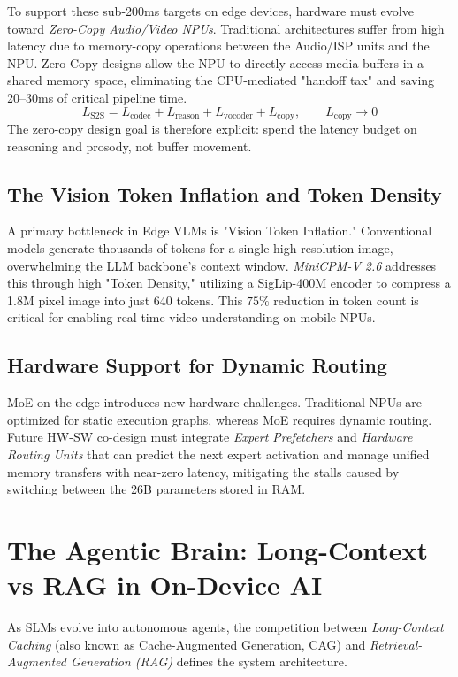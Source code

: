 \documentclass[twocolumn,10pt]{article}
\begin{document}
To support these sub-200ms targets on edge devices, hardware must evolve toward \textit{Zero-Copy Audio/Video NPUs}. Traditional architectures suffer from high latency due to memory-copy operations between the Audio/ISP units and the NPU. Zero-Copy designs allow the NPU to directly access media buffers in a shared memory space, eliminating the CPU-mediated "handoff tax" and saving 20--30ms of critical pipeline time.
\begin{equation}
L_{\mathrm{S2S}}=L_{\mathrm{codec}}+L_{\mathrm{reason}}+L_{\mathrm{vocoder}}+L_{\mathrm{copy}},
\qquad
L_{\mathrm{copy}}\rightarrow 0
\label{eq:s2s_latency}
\end{equation}
The zero-copy design goal is therefore explicit: spend the latency budget on reasoning and prosody, not buffer movement.

\subsection{The Vision Token Inflation and Token Density}
A primary bottleneck in Edge VLMs is "Vision Token Inflation." Conventional models generate thousands of tokens for a single high-resolution image, overwhelming the LLM backbone's context window. \textit{MiniCPM-V 2.6} \cite{minicpm_v_2025} addresses this through high "Token Density," utilizing a SigLip-400M \cite{siglip2023} encoder to compress a 1.8M pixel image into just 640 tokens. This $75\%$ reduction in token count is critical for enabling real-time video understanding on mobile NPUs.

\subsection{Hardware Support for Dynamic Routing}
MoE on the edge introduces new hardware challenges. Traditional NPUs are optimized for static execution graphs, whereas MoE requires dynamic routing. Future HW-SW co-design must integrate \textit{Expert Prefetchers} and \textit{Hardware Routing Units} that can predict the next expert activation and manage unified memory transfers with near-zero latency, mitigating the stalls caused by switching between the 26B parameters stored in RAM.

\section{The Agentic Brain: Long-Context vs RAG in On-Device AI}
As SLMs evolve into autonomous agents, the competition between \textit{Long-Context Caching} (also known as Cache-Augmented Generation, CAG) and \textit{Retrieval-Augmented Generation (RAG)} defines the system architecture.
\end{document}
